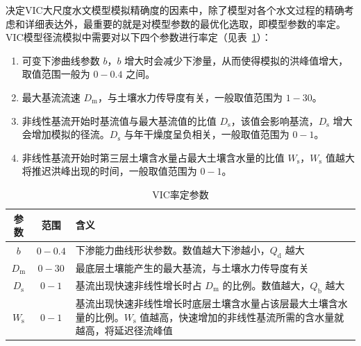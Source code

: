     决定VIC大尺度水文模型模拟精确度的因素中，除了模型对各个水文过程的精确考虑和详细表达外，最重要的就是对模型参数的最优化选取，即模型参数的率定。VIC模型径流模拟中需要对以下四个参数进行率定（见表~\ref{tab:VIC率定参数}）：
    \begin{enumerate}
      \item 可变下渗曲线参数 $b$，$b$ 增大时会减少下渗量，从而使得模拟的洪峰值增大，取值范围一般为 $0-0.4$ 之间。
      \item 最大基流流速 $D_{\mathrm {m}} $，与土壤水力传导度有关，一般取值范围为 $1-30$。
      \item 非线性基流开始时基流值与最大基流值的比值 $D_{\mathrm {s}} $，该值会影响基流，$D_{\mathrm {s}} $ 增大会增加模拟的径流。$D_{\mathrm {s}} $ 与年干燥度呈负相关，一般取值范围为 $0-1$。
      \item 非线性基流开始时第三层土壤含水量占最大土壤含水量的比值 $W_{\mathrm {s}} $，$W_{\mathrm {s}} $ 值越大将推迟洪峰出现的时间，一般取值范围为 $0-1$。
    \end{enumerate}
    {
      \begin{table}[htbp]
        \centering \renewcommand{\arraystretch}{1.5}
        \caption{VIC率定参数}
        \begin{tabular}{ccp{12cm}}
          \toprule
          参数  & 范围    & 含义                                                                                                                                   \\ \midrule
          $b$   & $0-0.4$ & 下渗能力曲线形状参数。数值越大下渗越小，$Q_{\mathrm {d}} $ 越大                                                                                     \\
          $D_{\mathrm {m}} $ & $0-30$  & 最底层土壤能产生的最大基流，与土壤水力传导度有关                                                                                       \\
          $D_{\mathrm {s}} $ & $0-1$   & 基流出现快速非线性增长时占 $D_{\mathrm {m}} $ 的比例。数值越大，$Q_{\mathrm {b}} $ 越大                                                                          \\
          $W_{\mathrm {s}} $ & $0-1$   & 基流出现快速非线性增长时底层土壤含水量占该层最大土壤含水量的比例。$W_{\mathrm {s}} $ 值越高，快速增加的非线性基流所需的含水量就越高，将延迟径流峰值 \\
          \bottomrule
        \end{tabular}
        \label{tab:VIC率定参数}
      \end{table}
    }

